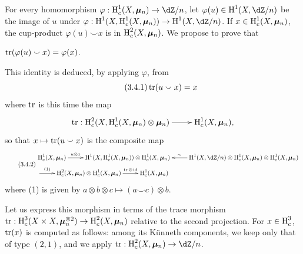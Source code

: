 \subsection{}\label{V:3-3}

For every homomorphism $\varphi:\h_c^1(X,\dmu_n)\to \dZ/n$, let
$\varphi(u)\in \h^1(X,\dZ/n)$ be the image of $u$ under
$\varphi:\h^1(X,\h_c^1(X,\dmu_n)) \to \h^1(X,\dZ/n)$. If
$x\in \operatorname{H}_c^1(X,{\bm\mu}_n)$, the cup-product $\varphi(u)\smallsmile x$ is in
$\operatorname{H}_c^2(X,{\bm\mu}_n)$. We propose to prove that




\begin{proposition_}\label{V:3-4}
$\operatorname{tr}(\varphi(u)\smallsmile x) = \varphi(x)$.
\end{proposition_}

This identity is deduced, by applying $\varphi$, from
\begin{equation*}\tag{3.4.1}\label{V:eq:3-4-1}
  \operatorname{tr}(u\smallsmile x) = x
\end{equation*}
where $\operatorname{tr}$ is this time the map
\[\xymatrix{
  \tr:\h_c^2(X,\h_c^1(X,\dmu_n)\otimes\dmu_n) \ar[r]
    & \h_c^1(X,\dmu_n) \text{,}
}\]
so that $x\mapsto \operatorname{tr}(u\smallsmile x)$ is the composite map
\small
\begin{equation*}\tag{3.4.2}\label{V:eq:3-4-2}
\begin{aligned}
&\xymatrix{
  \h_c^1(X,\dmu_n) \ar[r]^-{u\otimes x}
    & \h^1(X,\h_c^1(X,\dmu_n)) \otimes \h_c^1(X,\dmu_n)
    & \ar[l]_-\sim \h^1(X,\dZ/n)\otimes \h_c^1(X,\dmu_n) \otimes \h_c^1(X,\dmu_n)} \\ &\xymatrix{
    \ar[r]^-{(1)}
      & \h_c^2(X,\dmu_n) \otimes \h_c^1(X,\dmu_n) \ar[r]^-{\tr\otimes\operatorname{id}}
      & \h_c^1(X,\dmu_n)
}
\end{aligned}
\end{equation*}
\normalsize
where (1) is given by
$a\otimes b\otimes c\mapsto (a\smallsmile c)\otimes b$.

Let us express this morphism in terms of the trace morphism
$\operatorname{tr}:\operatorname{H}_c^3(X\times X,{\bm\mu}_n^{\otimes 2}) \to \operatorname{H}_c^2(X,{\bm\mu}_n)$ relative to the
second projection. For $x\in \operatorname{H}_c^3$, $\operatorname{tr}(x)$ is computed as follows: among its
K\"unneth components, we keep only that of type $(2,1)$, and we apply
$\tr:\h_c^2(X,\dmu_n) \to \dZ/n$.

